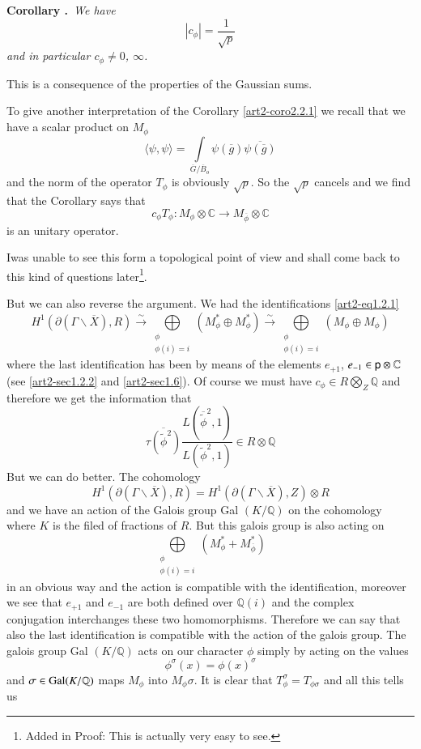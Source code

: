 \medskip
\noindent
{\bf Corollary .\label{art2-coro2.2.1}}~{\em We have}
$$
|c_{\phi}|=\frac{1}{\sqrt{p}}
$$
{\em and in particular $c_{\phi}\neq 0$, $\infty$.}
\smallskip

This is a consequence of the properties of the Gaussian sums.

To give another interpretation of the Corollary \ref{art2-coro2.2.1} we recall that we have a scalar product on $M_{\phi}$
$$
\langle \psi,\psi\rangle = \int\limits_{\overline{G}/\overline{B}_{o}}\psi(\overline{g})\overline{\psi(\overline{g})}
$$
and the norm of the operator $T_{\phi}$ is obviously $\sqrt{p}$. So the $\sqrt{p}$ cancels and we find that the Corollary says that
$$
c_{\phi}T_{\phi}:M_{\phi}\otimes \mathbb{C}\to M_{\overline{\phi}}\otimes \mathbb{C}
$$
is an unitary operator.

I\pageoriginale was unable to see this form a topological point of view and shall come back to this kind of questions later\footnote[1]{Added in Proof: This is actually very easy to see.}.

But we can also reverse the argument. We had the identifications \eqref{art2-eq1.2.1}
$$
H^{1}(\partial(\Gamma\backslash \overline{X}),R)\xrightarrow{\sim}\bigoplus\limits_{\substack{\phi\\ \phi(i)=i}}(M^{*}_{\phi}\oplus M^{*}_{\phi})\xrightarrow{\sim}\bigoplus\limits_{\substack{\phi\\ \phi(i)=i}}(M_{\phi}\oplus M_{\phi})
$$
where the last identification has been by means of the elements $e_{+1}$, $e_{-1}\in \mathsf{p} \otimes \mathbb{C}$ (see \ref{art2-sec1.2.2} and \ref{art2-sec1.6}). Of course we must have $c_{\phi}\in R\bigotimes\limits_{Z}\mathbb{Q}$ and therefore we get the information that
$$
\overline{\tau(\widetilde{\phi}^{2})}\frac{L(\overline{\widetilde{\phi}}^{2},1)}{L(\widetilde{\phi}^{2},1)}\in R\otimes \mathbb{Q}
$$
But we can do better. The cohomology
$$
H^{1}(\partial (\Gamma\backslash\overline{X}),R)=H^{1}(\partial(\Gamma\backslash\overline{X}),Z)\otimes R
$$
and we have an action of the Galois group Gal $(K/\mathbb{Q})$ on the cohomology where $K$ is the filed of fractions of $R$. But this galois group is also acting on 
$$
\bigoplus\limits_{\substack{\phi\\ \phi(i)=i}}(M^{*}_{\phi}+M^{*}_{\overline{\phi}})
$$
in an obvious way and the action is compatible with the identification, moreover we see that $e_{+1}$ and $e_{-1}$ are both defined over $\mathbb{Q}(i)$ and the complex conjugation interchanges these two homomorphisms. Therefore we can say that also the last identification is compatible with the action of the galois group. The galois group Gal $(K/\mathbb{Q})$ acts on our character $\phi$ simply by acting on the values
$$
\phi^{\sigma}(x)=\phi(x)^{\sigma}
$$
and $\sigma\in \operatorname{Gal}(K/\mathbb{Q})$ maps $M_{\phi}$ into $M_{\phi}\sigma$. It is clear that $T^{\sigma}_{\phi}=T_{\phi\sigma}$ and all this tells us

